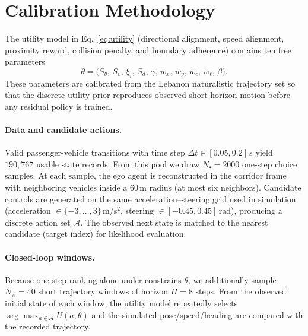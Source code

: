 \section{Calibration Methodology}
\label{sec:calibration_methodology}

The utility model in Eq.~\eqref{eq:utility} (directional alignment, speed alignment, proximity reward, collision penalty, and boundary adherence) contains ten free parameters
\[
\theta=\bigl(S_\theta,\,S_v,\,\xi_i,\,S_d,\,\gamma,\,w_x,\,w_y,\,w_c,\,w_\ell,\,\beta\bigr).
\]
These parameters are calibrated from the Lebanon naturalistic trajectory set so that the discrete utility prior reproduces observed short-horizon motion before any residual policy is trained.

\paragraph{Data and candidate actions.}
Valid passenger-vehicle transitions with time step $\Delta t\in[0.05,0.2]$\,s yield $190{,}767$ usable state records. From this pool we draw $N_{\mathrm{s}}=2000$ one-step choice samples. At each sample, the ego agent is reconstructed in the corridor frame with neighboring vehicles inside a $60$\,m radius (at most six neighbors). Candidate controls are generated on the same acceleration--steering grid used in simulation
(acceleration $\in\{-3,\ldots,3\}$\,m/s$^2$, steering $\in[-0.45,0.45]$\,rad), producing a discrete action set $\mathcal{A}$. The observed next state is matched to the nearest candidate (target index) for likelihood evaluation.

\paragraph{Closed-loop windows.}
Because one-step ranking alone under-constrains $\theta$, we additionally sample $N_{\mathrm{w}}=40$ short trajectory windows of horizon $H=8$ steps. From the observed initial state of each window, the utility model repeatedly selects $\arg\max_{a\in\mathcal{A}} U(a;\theta)$ and the simulated pose/speed/heading are compared with the recorded trajectory.

